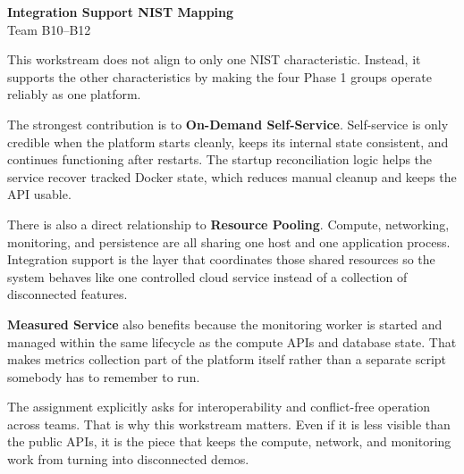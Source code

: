 \documentclass[11pt]{article}
\begin{document}
\begin{center}
    {\Large \textbf{Integration Support NIST Mapping}}\\
    Team B10--B12
\end{center}

This workstream does not align to only one NIST characteristic. Instead, it supports the other characteristics by making the four Phase 1 groups operate reliably as one platform.

The strongest contribution is to \textbf{On-Demand Self-Service}. Self-service is only credible when the platform starts cleanly, keeps its internal state consistent, and continues functioning after restarts. The startup reconciliation logic helps the service recover tracked Docker state, which reduces manual cleanup and keeps the API usable.

There is also a direct relationship to \textbf{Resource Pooling}. Compute, networking, monitoring, and persistence are all sharing one host and one application process. Integration support is the layer that coordinates those shared resources so the system behaves like one controlled cloud service instead of a collection of disconnected features.

\textbf{Measured Service} also benefits because the monitoring worker is started and managed within the same lifecycle as the compute APIs and database state. That makes metrics collection part of the platform itself rather than a separate script somebody has to remember to run.

The assignment explicitly asks for interoperability and conflict-free operation across teams. That is why this workstream matters. Even if it is less visible than the public APIs, it is the piece that keeps the compute, network, and monitoring work from turning into disconnected demos.
\end{document}
